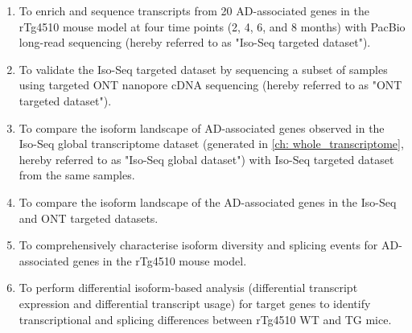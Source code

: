 \begin{enumerate}
	\item To enrich and sequence transcripts from 20 AD-associated genes in the rTg4510 mouse model at four time points (2, 4, 6, and 8 months) with PacBio long-read sequencing (hereby referred to as "Iso-Seq targeted dataset").
	\item To validate the Iso-Seq targeted dataset by sequencing a subset of samples using targeted ONT nanopore cDNA sequencing (hereby referred to as "ONT targeted dataset").
	\item To compare the isoform landscape of AD-associated genes observed in the Iso-Seq global transcriptome dataset (generated in \cref{ch: whole_transcriptome}, hereby referred to as "Iso-Seq global dataset") with Iso-Seq targeted dataset from the same samples. 
	\item To compare the isoform landscape of the AD-associated genes in the Iso-Seq and ONT targeted datasets.
	\item To comprehensively characterise isoform diversity and splicing events for AD-associated genes in the rTg4510 mouse model. 
	\item To perform differential isoform-based analysis (differential transcript expression and differential transcript usage) for target genes to identify transcriptional and splicing differences between rTg4510 WT and TG mice.
\end{enumerate} 
 

